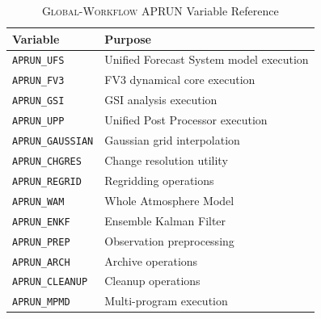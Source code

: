 \documentclass[11pt,twoside]{article}
\newcommand{\gw}{\textsc{Global-Workflow}}
\begin{document}
\begin{table}[H]
\centering
\caption{\gw{} APRUN Variable Reference}
\begin{tabular}{@{}lp{8cm}@{}}
\toprule
\textbf{Variable} & \textbf{Purpose} \\
\midrule
\texttt{APRUN\_UFS} & Unified Forecast System model execution \\
\texttt{APRUN\_FV3} & FV3 dynamical core execution \\
\texttt{APRUN\_GSI} & GSI analysis execution \\
\texttt{APRUN\_UPP} & Unified Post Processor execution \\
\texttt{APRUN\_GAUSSIAN} & Gaussian grid interpolation \\
\texttt{APRUN\_CHGRES} & Change resolution utility \\
\texttt{APRUN\_REGRID} & Regridding operations \\
\texttt{APRUN\_WAM} & Whole Atmosphere Model \\
\texttt{APRUN\_ENKF} & Ensemble Kalman Filter \\
\texttt{APRUN\_PREP} & Observation preprocessing \\
\texttt{APRUN\_ARCH} & Archive operations \\
\texttt{APRUN\_CLEANUP} & Cleanup operations \\
\texttt{APRUN\_MPMD} & Multi-program execution \\
\bottomrule
\end{tabular}
\end{table}
\end{document}
